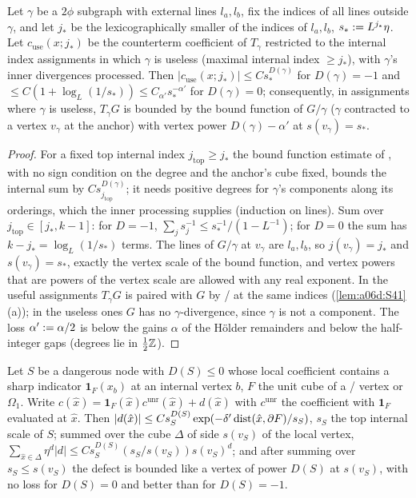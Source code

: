\begin{lemma}\label{lem:a06d:S45}
Let $\gamma$ be a $2\phi$ subgraph with external lines $l_a,l_b$, fix the indices of all lines outside $\gamma$, and let $j_*$ be the lexicographically smaller of the indices of $l_a,l_b$, $s_*:= L^{j_*}\eta$. Let $c_{\mathrm{use}}(x;j_*)$ be the counterterm coefficient of $T_\gamma$ restricted to the internal index assignments in which $\gamma$ is useless (maximal internal index $\ge j_*$), with $\gamma$'s inner divergences processed. Then $|c_{\mathrm{use}}(x;j_*)|\le Cs_*^{D(\gamma)}$ for $D(\gamma)=-1$ and $\le C(1+\log_L(1/s_*))\le C_{\alpha'}s_*^{-\alpha'}$ for $D(\gamma)=0$; consequently, in assignments where $\gamma$ is useless, $T_\gamma G$ is bounded by the bound function of $G/\gamma$ ($\gamma$ contracted to a vertex $v_\gamma$ at the anchor) with vertex power $D(\gamma)-\alpha'$ at $s(v_\gamma)=s_*$.
\end{lemma}

\begin{proof}
For a fixed top internal index $j_{\mathrm{top}}\ge j_*$ the bound function estimate of \cite[(2.16)]{Ba3}, with no sign condition on the degree and the anchor's cube fixed, bounds the internal sum by $Cs_{j_{\mathrm{top}}}^{D(\gamma)}$; it needs positive degrees for $\gamma$'s components along its orderings, which the inner processing supplies (induction on lines). Sum over $j_{\mathrm{top}}\in[j_*,k-1]$: for $D=-1$, $\sum_js_j^{-1}\le s_*^{-1}/(1-L^{-1})$; for $D=0$ the sum has $k-j_*=\log_L(1/s_*)$ terms. The lines of $G/\gamma$ at $v_\gamma$ are $l_a,l_b$, so $j(v_\gamma)=j_*$ and $s(v_\gamma)=s_*$, exactly the vertex scale of the bound function, and vertex powers that are powers of the vertex scale are allowed with any real exponent. In the useful assignments $T_\gamma G$ is paired with $G$ by \cite[(3.19)]{Ba3}/\cite[(3.11)]{Ba3} at the same indices (\cref{lem:a06d:S41}(a)); in the useless ones $G$ has no $\gamma$-divergence, since $\gamma$ is not a component. The loss $\alpha':=\alpha/2$ is below the gains $\alpha$ of the H\"older remainders and below the half-integer gaps (degrees lie in $\frac12\mathbb Z$).
\end{proof}

\begin{lemma}\label{lem:a06d:S46}
Let $S$ be a dangerous node with $D(S)\le0$ whose local coefficient contains a sharp indicator $\mathbf 1_F(x_b)$ at an internal vertex $b$, $F$ the unit cube of a \cite[(1.6)]{Ba3}/\cite[(1.7)]{Ba3} vertex or $\Omega_1$. Write $c(\hat x)=\mathbf 1_F(\hat x)c^{\mathrm{unr}}(\hat x)+d(\hat x)$ with $c^{\mathrm{unr}}$ the coefficient with $\mathbf 1_F$ evaluated at $\hat x$. Then $|d(\hat x)|\le Cs_S^{D(S)}\exp(-\delta'\operatorname{dist}(\hat x,\partial F)/s_S)$, $s_S$ the top internal scale of $S$; summed over the cube $\Delta$ of side $s(v_S)$ of the local vertex, $\sum_{\hat x\in\Delta}\eta^d|d|\le Cs_S^{D(S)}(s_S/s(v_S))s(v_S)^d$; and after summing over $s_S\le s(v_S)$ the defect is bounded like a vertex of power $D(S)$ at $s(v_S)$, with no loss for $D(S)=0$ and better than \cite[(2.3)]{Ba3} for $D(S)=-1$.
\end{lemma}

